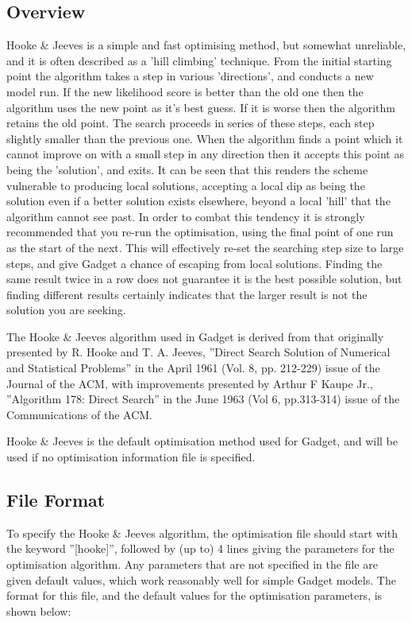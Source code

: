 \documentclass [a4paper, 10pt]{book}
\begin{document}
\subsection{Overview}\label{subsec:hookeover}
Hooke \& Jeeves is a simple and fast optimising method, but somewhat unreliable, and it is often described as a 'hill climbing' technique.  From the initial starting point the algorithm takes a step in various 'directions', and conducts a new model run.  If the new likelihood score is better than the old one then the algorithm uses the new point as it's best guess.  If it is worse then the algorithm retains the old point.  The search proceeds in series of these steps, each step slightly smaller than the previous one.  When the algorithm finds a point which it cannot improve on with a small step in any direction then it accepts this point as being the 'solution', and exits.  It can be seen that this renders the scheme vulnerable to producing local solutions, accepting a local dip as being the solution even if a better solution exists elsewhere, beyond a local 'hill' that the algorithm cannot see past.  In order to combat this tendency it is strongly recommended that you re-run the optimisation, using the final point of one run as the start of the next.  This will effectively re-set the searching step size to large steps, and give Gadget a chance of escaping from local solutions.  Finding the same result twice in a row does not guarantee it is the best possible solution, but finding different results certainly indicates that the larger result is not the solution you are seeking.

\bigskip
The Hooke \& Jeeves algorithm used in Gadget is derived from that originally presented by R. Hooke and T. A. Jeeves, ''Direct Search Solution of Numerical and Statistical Problems'' in the April 1961 (Vol. 8, pp. 212-229) issue of the Journal of the ACM, with improvements presented by Arthur F Kaupe Jr., ''Algorithm 178: Direct Search'' in the June 1963 (Vol 6, pp.313-314) issue of the Communications of the ACM.

\bigskip
Hooke \& Jeeves is the default optimisation method used for Gadget, and will be used if no optimisation information file is specified.

\subsection{File Format}\label{subsec:hookefile}
To specify the Hooke \& Jeeves algorithm, the optimisation file should start with the keyword ''[hooke]'', followed by (up to) 4 lines giving the parameters for the optimisation algorithm.  Any parameters that are not specified in the file are given default values, which work reasonably well for simple Gadget models.  The format for this file, and the default values for the optimisation parameters, is shown below:
\end{document}
